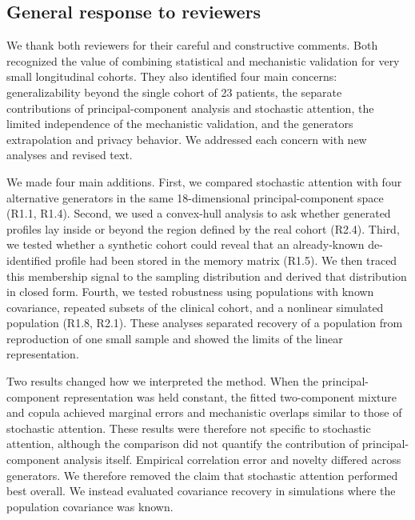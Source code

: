 \documentclass[
  11pt,
  letterpaper,
]{article}
\begin{document}
\subsection{General response to reviewers}\label{general-response-to-reviewers}

We thank both reviewers for their careful and constructive comments. Both recognized the value of combining statistical and mechanistic validation for very small longitudinal cohorts. They also identified four main concerns: generalizability beyond the single cohort of 23 patients, the separate contributions of principal-component analysis and stochastic attention, the limited independence of the mechanistic validation, and the generator\textquotesingle s extrapolation and privacy behavior. We addressed each concern with new analyses and revised text.

We made four main additions. First, we compared stochastic attention with four alternative generators in the same 18-dimensional principal-component space (R1.1, R1.4). Second, we used a convex-hull analysis to ask whether generated profiles lay inside or beyond the region defined by the real cohort (R2.4). Third, we tested whether a synthetic cohort could reveal that an already-known de-identified profile had been stored in the memory matrix (R1.5). We then traced this membership signal to the sampling distribution and derived that distribution in closed form. Fourth, we tested robustness using populations with known covariance, repeated subsets of the clinical cohort, and a nonlinear simulated population (R1.8, R2.1). These analyses separated recovery of a population from reproduction of one small sample and showed the limits of the linear representation.

Two results changed how we interpreted the method. When the principal-component representation was held constant, the fitted two-component mixture and copula achieved marginal errors and mechanistic overlaps similar to those of stochastic attention. These results were therefore not specific to stochastic attention, although the comparison did not quantify the contribution of principal-component analysis itself. Empirical correlation error and novelty differed across generators. We therefore removed the claim that stochastic attention performed best overall. We instead evaluated covariance recovery in simulations where the population covariance was known.
\end{document}
